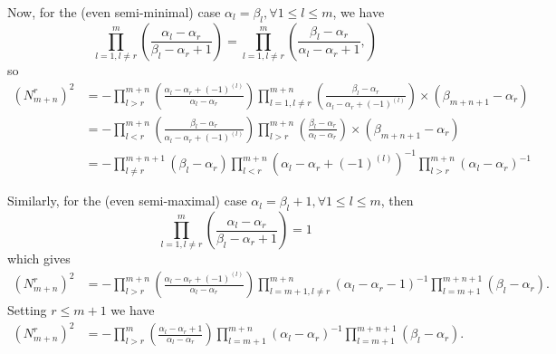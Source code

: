 \documentclass[12pt]{article}
\begin{document}
Now, for the (even semi-minimal) case $\alpha_l = \beta_l, \forall 1 \leq l \leq m$, we have
$$
\prod_{l =1,l \neq r}^m \left( \frac{\alpha_l - \alpha_r}{\beta_l - \alpha_r + 1} \right) = \prod_{l =1,l \neq r}^m \left( \frac{\beta_l - \alpha_r}{\alpha_l - \alpha_r + 1}, \right)
$$
so 
\begin{align*}
\left(N^r_{m+n}\right)^2 &= - \prod_{l > r}^{m+n} \left( \frac{\alpha_l - \alpha_r + (-1)^{(l)} }{\alpha_l - \alpha_r  } \right)
\prod_{l =1,l \neq r}^{m+n} \left( \frac{\beta_l - \alpha_r}{\alpha_l - \alpha_r + (-1)^{(l)}} \right) \times (\beta_{m+n+1} - \alpha_r)\\
&= - \prod_{l < r}^{m+n} \left( \frac{\beta_l - \alpha_r}{\alpha_l - \alpha_r + (-1)^{(l)}} \right) 
\prod_{l > r}^{m+n} \left( \frac{\beta_l - \alpha_r  }{\alpha_l - \alpha_r  } \right) \times (\beta_{m+n+1} - \alpha_r) \\
&= - \prod_{l \neq r}^{m+n+1} ( \beta_l - \alpha_r) \prod_{l < r}^{m+n} (\alpha_l - \alpha_r + (-1)^{(l)} )^{-1} \prod_{l > r}^{m+n} (\alpha_l - \alpha_r)^{-1}
\end{align*}

Similarly, for the (even semi-maximal) case $\alpha_l = \beta_l + 1, \forall 1 \leq l \leq m$, then
$$
\prod_{l =1,l \neq r}^m \left( \frac{\alpha_l - \alpha_r}{\beta_l - \alpha_r + 1} \right) = 1
$$
which gives
\begin{align*}
\left(N^r_{m+n}\right)^2 &= - \prod_{l > r}^{m+n} \left( \frac{\alpha_l - \alpha_r + (-1)^{(l)} }{\alpha_l - \alpha_r  } \right) 
\prod^{m+n}_{l=m+1,l \neq r} (\alpha_l - \alpha_r - 1)^{-1} 
\prod^{m+n+1}_{l=m+1} (\beta_l - \alpha_r).
\end{align*}
Setting $r \leq m+1$ we have
\begin{align*}
\left(N^r_{m+n}\right)^2 &= - \prod_{l > r}^{m} \left( \frac{\alpha_l - \alpha_r + 1 }{\alpha_l - \alpha_r  } \right) 
\prod^{m+n}_{l=m+1} (\alpha_l - \alpha_r)^{-1} 
\prod^{m+n+1}_{l=m+1} (\beta_l - \alpha_r).
\end{align*}
\end{document}

